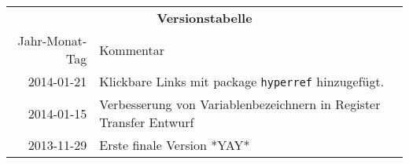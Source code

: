 \begin{table}[htp]
\centering
\begin{tabularx}{\columnwidth}{rp{}}
\multicolumn{2}{c}{\textbf{Versionstabelle}} \\
Jahr-Monat-Tag & Kommentar \\ \hline
2014-01-21 & Klickbare Links mit package \texttt{hyperref} hinzugefügt. \\
2014-01-15 & Verbesserung von Variablenbezeichnern in Register Transfer Entwurf \\
2013-11-29 & Erste finale Version *YAY* \\
\end{tabularx}
\end{table}